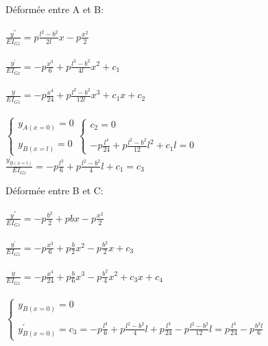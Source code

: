 \documentclass[a4paper]{article}
\begin{document}
~\\
~\\
~\\
\begin{minipage}[t]{9cm}
Déformée entre A et B:\\
~\\
$\frac{y^{''}}{EI_{Gz}} = p\frac{l^2-b^2}{2l}x - p\frac{x^2}{2}$\\
~\\
$\frac{y^{'}}{EI_{Gz}} = -p\frac{x^3}{6} + p\frac{l^2-b^2}{4l}x^2 + c_1$\\
~\\
$\frac{y}{EI_{Gz}} = -p\frac{x^4}{24} + p\frac{l^2-b^2}{12l}x^3 + c_1x + c_2$\\
~\\
$\begin{cases}
y_{A(x=0)} = 0\\
~\\
y_{B(x=l)} = 0
\end{cases}
\begin{cases}
c_2 = 0\\
~\\
-p\frac{l^4}{24} + p\frac{l^2-b^2}{12}l^2 + c_1l = 0
\end{cases}$
~\\
$\frac{y^{'}_{B(x=l)}}{EI_{Gz}} =
 -p\frac{l^3}{6} + p\frac{l^2-b^2}{4}l + c_1 = c_3$
\end{minipage}
\begin{minipage}[t]{10cm}
Déformée entre B et C:\\
~\\
$\frac{y^{''}}{EI_{Gz}} = -p\frac{b^2}{2} + pbx - p\frac{x^2}{2}$\\
~\\
$\frac{y^{'}}{EI_{Gz}} =
 -p\frac{x^3}{6} + p\frac{b}{2}x^2 - p\frac{b^2}{2}x + c_3$\\
~\\
$\frac{y}{EI_{Gz}} =
 -p\frac{x^4}{24} + p\frac{b}{6}x^3 - p\frac{b^2}{4}x^2 + c_3x + c_4$\\
~\\
$\begin{cases}
y_{B(x=0)} = 0\\
~\\
y^{'}_{B(x=0)} = c_3 = -p\frac{l^3}{6} + p\frac{l^2-b^2}{4}l +
 p\frac{l^3}{24} - p\frac{l^2-b^2}{12}l = p\frac{l^3}{24} - p\frac{b^2l}{6}
\end{cases}$\\
\end{minipage}
\end{document}
